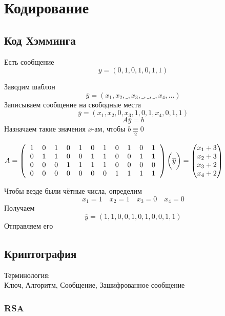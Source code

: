 \chapter{Кодирование}

\section{Код Хэмминга}

\begin{algorithm}

Есть сообщение
$$ y = (0,1,0,1,0,1,1)$$

Заводим шаблон
$$ \overline{y}=(x_1,x_2,\_,x_3,\_,\_,\_,x_4,...)$$
Записываем сообщение на свободные места
$$ \overline{y}=(x_1,x_2,0,x_3,1,0,1,x_4,0,1,1)$$
$$ A\overline{y} = b $$
Назначаем такие значения $x$-ам, чтобы $b \underset{2}{\equiv} 0$

$ A = \left( \begin{tabular}{c c c c c c c c c c c}
       	1 & 0 & 1 & 0 & 1 & 0 & 1 & 0 & 1 & 0 & 1 \\
        0 & 1 & 1 & 0 & 0 & 1 & 1 & 0 & 0 & 1 & 1 \\
        0 & 0 & 0 & 1 & 1 & 1 & 1 & 0 & 0 & 0 & 0 \\
        0 & 0 & 0 & 0 & 0 & 0 & 0 & 1 & 1 & 1 & 1
    \end{tabular} \right) \bigg(\overline{y}\bigg) = \begin{pmatrix}
        x_1 + 3 \\ x_2 + 3 \\ x_3 + 2 \\ x_4 + 2
    \end{pmatrix} $

Чтобы везде были чётные числа, определим
$$ x_1 = 1 \quad x_2 = 1 \quad x_3 = 0 \quad x_4 = 0 $$
Получаем
$$ \overline{y} = (1, 1, 0, 0, 1, 0, 1, 0, 0, 1, 1) $$
Отправляем его

\end{algorithm}

\section{Криптография}

Терминология: \\
Ключ, Алгоритм, Сообщение, Зашифрованное сообщение \\

\subsection{RSA}

